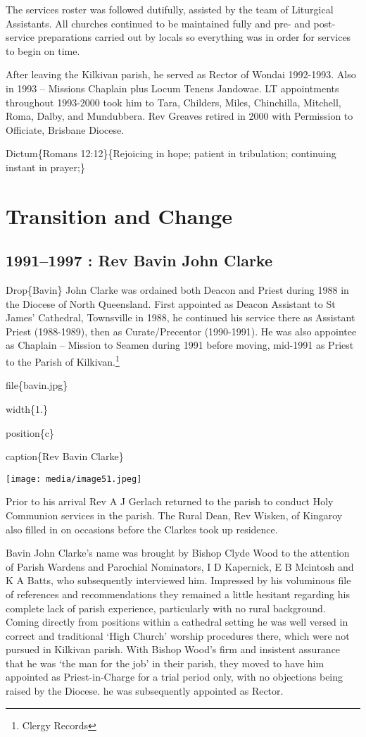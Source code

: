 The services roster was followed dutifully, assisted by the team of Liturgical Assistants. All churches continued to be maintained fully and pre- and post-service preparations carried out by locals so everything was in order for services to begin on time.

After leaving the Kilkivan parish, he served as Rector of Wondai 1992-1993. Also in 1993 -- Missions Chaplain plus Locum Tenens Jandowae. LT appointments throughout 1993-2000 took him to Tara, Childers, Miles, Chinchilla, Mitchell, Roma, Dalby, and Mundubbera. Rev Greaves retired in 2000 with Permission to Officiate, Brisbane Diocese.

Dictum\{Romans 12:12\}\{Rejoicing in hope; patient in tribulation; continuing instant in prayer;\}

\hypertarget{transition-and-change}{%
\chapter{Transition and Change}\label{transition-and-change}}

\hypertarget{rev-bavin-john-clarke}{%
\section{1991--1997 : Rev Bavin John Clarke}\label{rev-bavin-john-clarke}}

Drop\{Bavin\} John Clarke was ordained both Deacon and Priest during 1988 in the Diocese of North Queensland. First appointed as Deacon Assistant to St James' Cathedral, Townsville in 1988, he continued his service there as Assistant Priest (1988-1989), then as Curate/Precentor (1990-1991). He was also appointee as Chaplain -- Mission to Seamen during 1991 before moving, mid-1991 as Priest to the Parish of Kilkivan.\footnote{Clergy Records}

file\{bavin.jpg\}

width\{1.\}

position\{c\}

caption\{Rev Bavin Clarke\}

\texttt{[image: media/image51.jpeg]}

Prior to his arrival Rev A J Gerlach returned to the parish to conduct Holy Communion services in the parish. The Rural Dean, Rev Wisken, of Kingaroy also filled in on occasions before the Clarkes took up residence.

Bavin John Clarke's name was brought by Bishop Clyde Wood to the attention of Parish Wardens and Parochial Nominators, I D Kapernick, E B Mcintosh and K A Batts, who subsequently interviewed him. Impressed by his voluminous file of references and recommendations they remained a little hesitant regarding his complete lack of parish experience, particularly with no rural background. Coming directly from positions within a cathedral setting he was well versed in correct and traditional `High Church' worship procedures there, which were not pursued in Kilkivan parish. With Bishop Wood's firm and insistent assurance that he was `the man for the job' in their parish, they moved to have him appointed as Priest-in-Charge for a trial period only, with no objections being raised by the Diocese. he was subsequently appointed as Rector.

